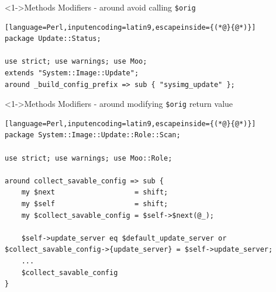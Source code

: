 \documentclass[ngerman,xcolor={table,dvipsnames},smaller,compress,hyperref={bookmarks,colorlinks}]{beamer}%
\begin{document}
\begin{frame}[t,fragile]

\begin{block}<1->{Methods Modifiers - around avoid calling \texttt{\$orig}}
\scriptsize
\begin{lstlisting}[language=Perl,inputencoding=latin9,escapeinside={(*@}{@*)}]
package Update::Status;

use strict; use warnings; use Moo;
extends "System::Image::Update";
around _build_config_prefix => sub { "sysimg_update" };
\end{lstlisting}
\end{block}

\begin{itemize}
\end{itemize}

\end{frame}

\begin{frame}[t,fragile]

\begin{block}<1->{Methods Modifiers - around modifying \texttt{\$orig} return value}
\scriptsize
\begin{lstlisting}[language=Perl,inputencoding=latin9,escapeinside={(*@}{@*)}]
package System::Image::Update::Role::Scan;

use strict; use warnings; use Moo::Role;

around collect_savable_config => sub {
    my $next                   = shift;
    my $self                   = shift;
    my $collect_savable_config = $self->$next(@_);

    $self->update_server eq $default_update_server or $collect_savable_config->{update_server} = $self->update_server;
    ...
    $collect_savable_config
}
\end{lstlisting}
\end{block}

\begin{itemize}
\end{itemize}

\end{frame}
\end{document}
